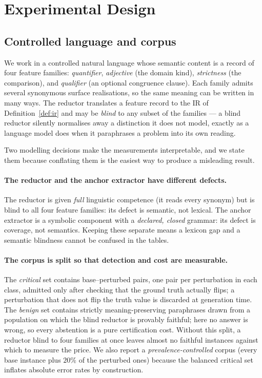 \documentclass[11pt]{article}
\theoremstyle{definition}
\begin{document}
\section{Experimental Design}
\label{sec:setup}

\subsection{Controlled language and corpus}
\label{sec:corpus}

We work in a controlled natural language whose semantic content is a record of
four feature families: \emph{quantifier}, \emph{adjective} (the domain kind),
\emph{strictness} (the comparison), and \emph{qualifier} (an optional congruence
clause). Each family admits several synonymous surface realisations, so the same
meaning can be written in many ways. The reductor translates a feature record to
the IR of Definition~\ref{def:ir} and may be \emph{blind} to any subset of the
families --- a blind reductor silently normalises away a distinction it does not
model, exactly as a language model does when it paraphrases a problem into its
own reading.

Two modelling decisions make the measurements interpretable, and we state them
because conflating them is the easiest way to produce a misleading result.

\paragraph{The reductor and the anchor extractor have different defects.}
The reductor is given \emph{full} linguistic competence (it reads every synonym)
but is blind to all four feature families: its defect is semantic, not lexical.
The anchor extractor is a symbolic component with a \emph{declared, closed}
grammar: its defect is coverage, not semantics. Keeping these separate means a
lexicon gap and a semantic blindness cannot be confused in the tables.

\paragraph{The corpus is split so that detection and cost are measurable.}
The \emph{critical} set contains base--perturbed pairs, one pair per perturbation
in each class, admitted only after checking that the ground truth actually
flips; a perturbation that does not flip the truth value is discarded at
generation time. The \emph{benign} set contains strictly meaning-preserving
paraphrases drawn from a population on which the blind reductor is provably
faithful; here no answer is wrong, so every abstention is a pure certification
cost. Without this split, a reductor blind to four families at once leaves almost
no faithful instances against which to measure the price. We also report a
\emph{prevalence-controlled} corpus (every base instance plus $20\%$ of the
perturbed ones) because the balanced critical set inflates absolute error rates
by construction.
\end{document}
